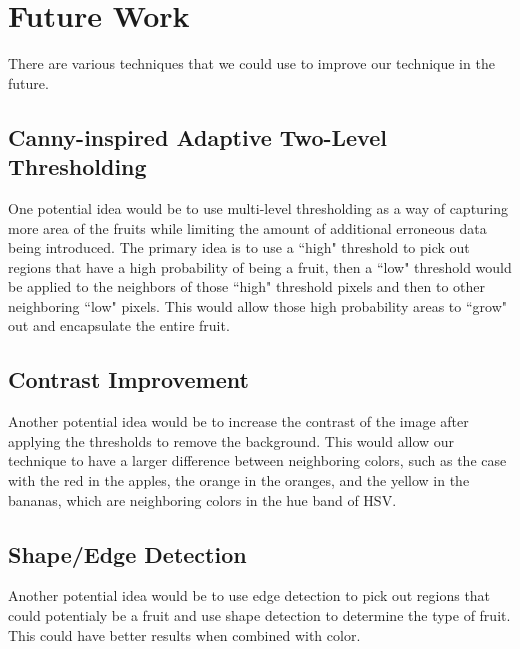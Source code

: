 \documentclass{article}
\begin{document}
\section{Future Work}
There are various techniques that we could use to improve our technique in the future.
\subsection{Canny-inspired Adaptive Two-Level Thresholding}
One potential idea would be to use multi-level thresholding as a way of capturing more area of the fruits while limiting the amount of additional erroneous data being introduced. The primary idea is to use a ``high" threshold to pick out regions that have a high probability of being a fruit, then a ``low" threshold would be applied to the neighbors of those ``high" threshold pixels and then to other neighboring ``low" pixels. This would allow those high probability areas to ``grow" out and encapsulate the entire fruit.
\subsection{Contrast Improvement}
Another potential idea would be to increase the contrast of the image after applying the thresholds to remove the background. This would allow our technique to have a larger difference between neighboring colors, such as the case with the red in the apples, the orange in the oranges, and the yellow in the bananas, which are neighboring colors in the hue band of HSV.    
\subsection{Shape/Edge Detection}
Another potential idea would be to use edge detection to pick out regions that could potentialy be a fruit and use shape detection to determine the type of fruit. This could have better results when combined with color. 
\end{document}

